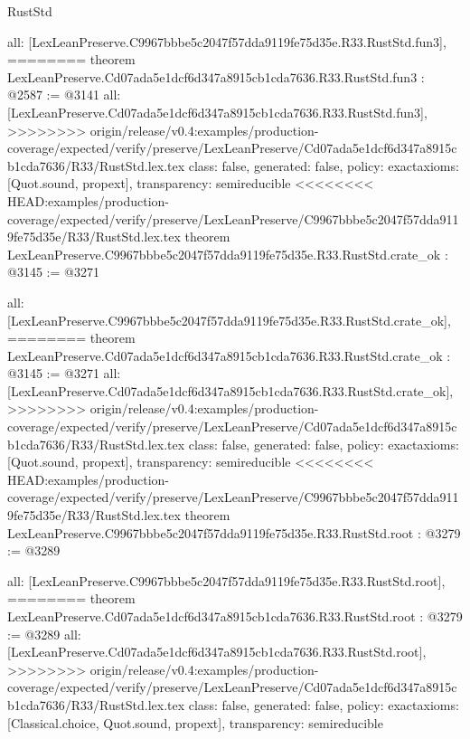 \begin{lexlean}{RustStd}
\begin{coremodule}
{\begin{coremodule}
{{{{{{  all: [LexLeanPreserve.C9967bbbe5c2047f57dda9119fe75d35e.R33.RustStd.fun3],
========
theorem LexLeanPreserve.Cd07ada5e1dcf6d347a8915cb1cda7636.R33.RustStd.fun3 : @2587 := @3141 {
  all: [LexLeanPreserve.Cd07ada5e1dcf6d347a8915cb1cda7636.R33.RustStd.fun3],
>>>>>>>> origin/release/v0.4:examples/production-coverage/expected/verify/preserve/LexLeanPreserve/Cd07ada5e1dcf6d347a8915cb1cda7636/R33/RustStd.lex.tex
  class: false,
  generated: false,
  policy: exact{axioms: [Quot.sound, propext]},
  transparency: semireducible
}
<<<<<<<< HEAD:examples/production-coverage/expected/verify/preserve/LexLeanPreserve/C9967bbbe5c2047f57dda9119fe75d35e/R33/RustStd.lex.tex
theorem LexLeanPreserve.C9967bbbe5c2047f57dda9119fe75d35e.R33.RustStd.crate_ok : @3145 := @3271 {
  all: [LexLeanPreserve.C9967bbbe5c2047f57dda9119fe75d35e.R33.RustStd.crate_ok],
========
theorem LexLeanPreserve.Cd07ada5e1dcf6d347a8915cb1cda7636.R33.RustStd.crate_ok : @3145 := @3271 {
  all: [LexLeanPreserve.Cd07ada5e1dcf6d347a8915cb1cda7636.R33.RustStd.crate_ok],
>>>>>>>> origin/release/v0.4:examples/production-coverage/expected/verify/preserve/LexLeanPreserve/Cd07ada5e1dcf6d347a8915cb1cda7636/R33/RustStd.lex.tex
  class: false,
  generated: false,
  policy: exact{axioms: [Quot.sound, propext]},
  transparency: semireducible
}
<<<<<<<< HEAD:examples/production-coverage/expected/verify/preserve/LexLeanPreserve/C9967bbbe5c2047f57dda9119fe75d35e/R33/RustStd.lex.tex
theorem LexLeanPreserve.C9967bbbe5c2047f57dda9119fe75d35e.R33.RustStd.root : @3279 := @3289 {
  all: [LexLeanPreserve.C9967bbbe5c2047f57dda9119fe75d35e.R33.RustStd.root],
========
theorem LexLeanPreserve.Cd07ada5e1dcf6d347a8915cb1cda7636.R33.RustStd.root : @3279 := @3289 {
  all: [LexLeanPreserve.Cd07ada5e1dcf6d347a8915cb1cda7636.R33.RustStd.root],
>>>>>>>> origin/release/v0.4:examples/production-coverage/expected/verify/preserve/LexLeanPreserve/Cd07ada5e1dcf6d347a8915cb1cda7636/R33/RustStd.lex.tex
  class: false,
  generated: false,
  policy: exact{axioms: [Classical.choice, Quot.sound, propext]},
  transparency: semireducible
}

}}}}}}}}
\end{coremodule}}
\end{coremodule}
\end{lexlean}
